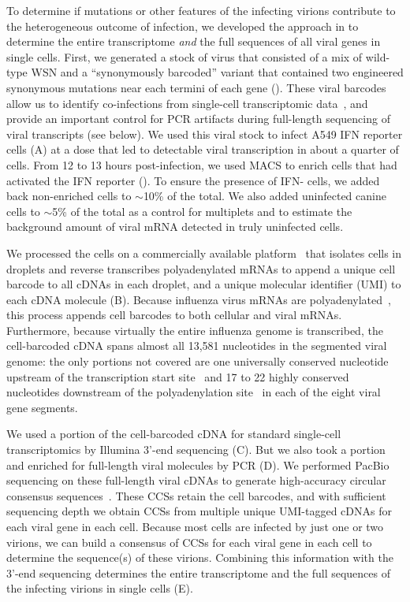 \documentclass[9pt,lineno]{elife}
\begin{document}
To determine if mutations or other features of the infecting virions contribute to the heterogeneous outcome of infection, we developed the approach in  to determine the entire transcriptome \emph{and} the full sequences of all viral genes in single cells.
First, we generated a stock of virus that consisted of a mix of wild-type WSN and a ``synonymously barcoded'' variant that contained two engineered synonymous mutations near each termini of each gene ().
These viral barcodes allow us to identify co-infections from single-cell transcriptomic data~\citep{russell2018extreme}, and provide an important control for PCR artifacts during full-length sequencing of viral transcripts (see below).
We used this viral stock to infect A549 IFN reporter cells (A) at a dose that led to detectable viral transcription in about a quarter of cells.
From 12 to 13 hours post-infection, we used MACS to enrich cells that had activated the IFN reporter ().
To ensure the presence of IFN- cells, we added back non-enriched cells to $\sim$10\% of the total.
We also added uninfected canine cells to $\sim$5\% of the total as a control for multiplets and to estimate the background amount of viral mRNA detected in truly uninfected cells.

We processed the cells on a commercially available platform~\citep{zheng2017massively} that isolates cells in droplets and reverse transcribes polyadenylated mRNAs to append a unique cell barcode to all cDNAs in each droplet, and a unique molecular identifier (UMI) to each cDNA molecule (B).
Because influenza virus mRNAs are polyadenylated~\citep{robertson1981polyadenylation}, this process appends cell barcodes to both cellular and viral mRNAs.
Furthermore, because virtually the entire influenza genome is transcribed, the cell-barcoded cDNA spans almost all 13,581 nucleotides in the segmented viral genome: the only portions not covered are one universally conserved nucleotide upstream of the transcription start site~\citep{koppstein2015sequencing} and 17 to 22 highly conserved nucleotides downstream of the polyadenylation site~\citep{robertson1981polyadenylation} in each of the eight viral gene segments.

We used a portion of the cell-barcoded cDNA for standard single-cell transcriptomics by Illumina 3'-end sequencing (C).
But we also took a portion and enriched for full-length viral molecules by PCR (D).
We performed PacBio sequencing on these full-length viral cDNAs to generate high-accuracy circular consensus sequences~\citep[CCSs;][]{travers2010flexible}.
These CCSs retain the cell barcodes, and with sufficient sequencing depth we obtain CCSs from multiple unique UMI-tagged cDNAs for each viral gene in each cell.
Because most cells are infected by just one or two virions, we can build a consensus of CCSs for each viral gene in each cell to determine the sequence(s) of these virions.
Combining this information with the 3'-end sequencing determines the entire transcriptome and the full sequences of the infecting virions in single cells (E).
\end{document}
